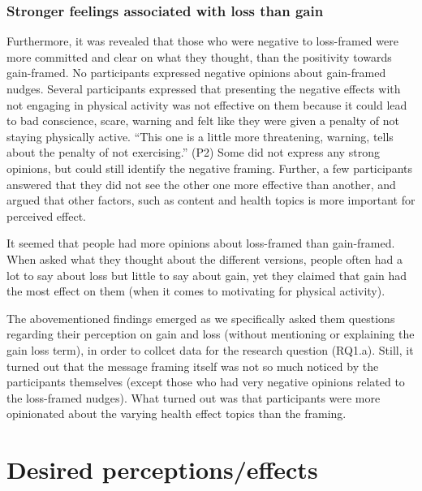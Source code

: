 \subsubsection{Stronger feelings associated with loss than gain}
Furthermore, it was revealed that those who were negative to loss-framed were more committed and clear on what they thought, than the positivity towards gain-framed. No participants expressed negative opinions about gain-framed nudges.
Several participants expressed that presenting the negative effects with not engaging in physical activity was not effective on them because it could lead to bad conscience, scare, warning and felt like they were given a penalty of not staying physically active. 
“This one is a little more threatening, warning, tells about the penalty of not exercising.” (P2)
Some did not express any strong opinions, but could still identify the negative framing. 
Further, a few participants answered that they did not see the other one more effective than another, and argued that other factors, such as content and health topics is more important for perceived effect. 

It seemed that people had more opinions about loss-framed than gain-framed. When asked what they thought about the different versions, people often had a lot to say about loss but little to say about gain, yet they claimed that gain had the most effect on them (when it comes to motivating for physical activity).

The abovementioned findings emerged as we specifically asked them questions regarding their perception on gain and loss (without mentioning or explaining the gain loss term), in order to collcet data for the research question (RQ1.a). Still, it turned out that the message framing itself was not so much noticed by the participants themselves (except those who had very negative opinions related to the loss-framed nudges). What turned out was that participants were more opinionated about the varying health effect topics than the framing.


\section{Desired perceptions/effects}

